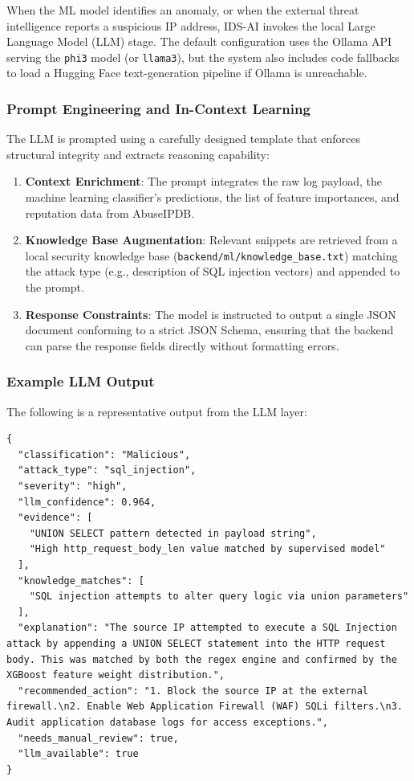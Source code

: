 \documentclass[12pt,a4paper]{report}
\begin{document}
When the ML model identifies an anomaly, or when the external threat intelligence reports a suspicious IP address, IDS-AI invokes the local Large Language Model (LLM) stage. The default configuration uses the Ollama API serving the \texttt{phi3} model (or \texttt{llama3}), but the system also includes code fallbacks to load a Hugging Face text-generation pipeline if Ollama is unreachable.

\subsubsection{Prompt Engineering and In-Context Learning}

The LLM is prompted using a carefully designed template that enforces structural integrity and extracts reasoning capability:
\begin{enumerate}[leftmargin=1.5em]
  \item \textbf{Context Enrichment}: The prompt integrates the raw log payload, the machine learning classifier's predictions, the list of feature importances, and reputation data from AbuseIPDB.
  \item \textbf{Knowledge Base Augmentation}: Relevant snippets are retrieved from a local security knowledge base (\texttt{backend/ml/knowledge\_base.txt}) matching the attack type (e.g., description of SQL injection vectors) and appended to the prompt.
  \item \textbf{Response Constraints}: The model is instructed to output a single JSON document conforming to a strict JSON Schema, ensuring that the backend can parse the response fields directly without formatting errors.
\end{enumerate}

\subsubsection{Example LLM Output}

The following is a representative output from the LLM layer:

\begin{lstlisting}[style=jsonstyle, caption={Example LLM layer output}]
{
  "classification": "Malicious",
  "attack_type": "sql_injection",
  "severity": "high",
  "llm_confidence": 0.964,
  "evidence": [
    "UNION SELECT pattern detected in payload string",
    "High http_request_body_len value matched by supervised model"
  ],
  "knowledge_matches": [
    "SQL injection attempts to alter query logic via union parameters"
  ],
  "explanation": "The source IP attempted to execute a SQL Injection attack by appending a UNION SELECT statement into the HTTP request body. This was matched by both the regex engine and confirmed by the XGBoost feature weight distribution.",
  "recommended_action": "1. Block the source IP at the external firewall.\n2. Enable Web Application Firewall (WAF) SQLi filters.\n3. Audit application database logs for access exceptions.",
  "needs_manual_review": true,
  "llm_available": true
}
\end{lstlisting}
\end{document}

